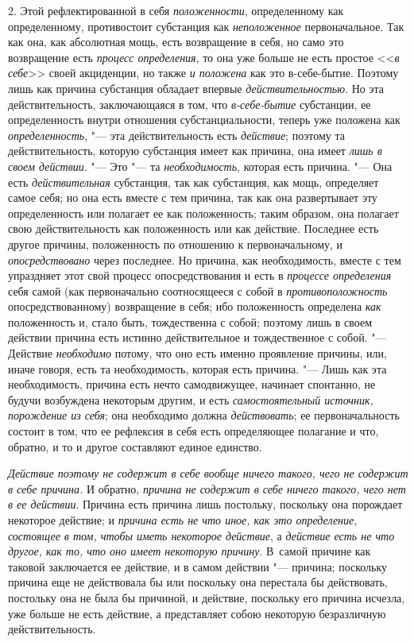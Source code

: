 2. Этой рефлектированной в себя {\em положенности},
определенному как определенному, противостоит субстанция как
{\em неположенное} первоначальное. Так как она, как
абсолютная мощь, есть возвращение в себя, но само это возвращение есть
{\em процесс определения}, то она уже больше не есть
простое <<{\em в себе}>> своей акциденции, но также
{\em и положена} как это в-себе-бытие. Поэтому лишь как
причина субстанция обладает впервые
{\em действительностью}. Но эта действительность,
заключающаяся в том, что {\em в-себе-бытие} субстанции,
ее определенность внутри отношения субстанциальности, теперь уже положена
как {\em определенность}, "--- эта действительность есть
{\em действие}; поэтому та действительность, которую
субстанция имеет как причина, она имеет {\em лишь в
своем действии}. "--- Это "--- та {\em необходимость},
которая есть причина. "--- Она есть {\em действительная}
субстанция, так как субстанция, как мощь, определяет самое себя; но она
есть вместе с тем причина, так как она развертывает эту определенность или
полагает ее как положенность; таким образом, она полагает свою
действительность как положенность или как действие. Последнее есть другое
причины, положенность по отношению к первоначальному, и
{\em опосредствовано} через последнее. Но причина, как
необходимость, вместе с тем упраздняет этот свой процесс опосредствования и
есть в {\em процессе определения} себя самой (как
первоначально соотносящееся с собой в
{\em противоположность} опосредствованному) возвращение
в себя; ибо положенность определена {\em как}
положенность и, стало быть, тождественна с собой; поэтому лишь в своем
действии причина есть истинно действительное и тождественное с собой. "---
Действие {\em необходимо} потому, что оно есть именно
проявление причины, или, иначе говоря, есть та необходимость, которая есть
причина. "--- Лишь как эта необходимость, причина есть нечто самодвижущее,
начинает спонтанно, не будучи возбуждена некоторым другим, и есть
{\em самостоятельный источник, порождение из себя}; она
необходимо должна {\em действовать}; ее
первоначальность состоит в том, что ее рефлексия в себя есть определяющее
полагание и что, обратно, и то и другое составляют единое единство.

{\em Действие поэтому не содержит в себе вообще ничего
такого, чего не содержит в себе причина.} И обратно,
{\em причина не содержит в себе ничего такого, чего нет
в ее действии}. Причина есть причина лишь постольку, поскольку она
порождает некоторое действие; и {\em причина есть не
что иное, как это определение, состоящее в том, чтобы иметь некоторое
действие}, а {\em действие есть не что другое, как то,
что оно имеет некоторую причину}. В~самой причине как таковой заключается
ее действие, и в самом действии "--- причина; поскольку причина еще не
действовала бы или поскольку она перестала бы действовать, постольку она не
была бы причиной, и действие, поскольку его причина исчезла, уже больше не
есть действие, а представляет собою некоторую безразличную действительность.

